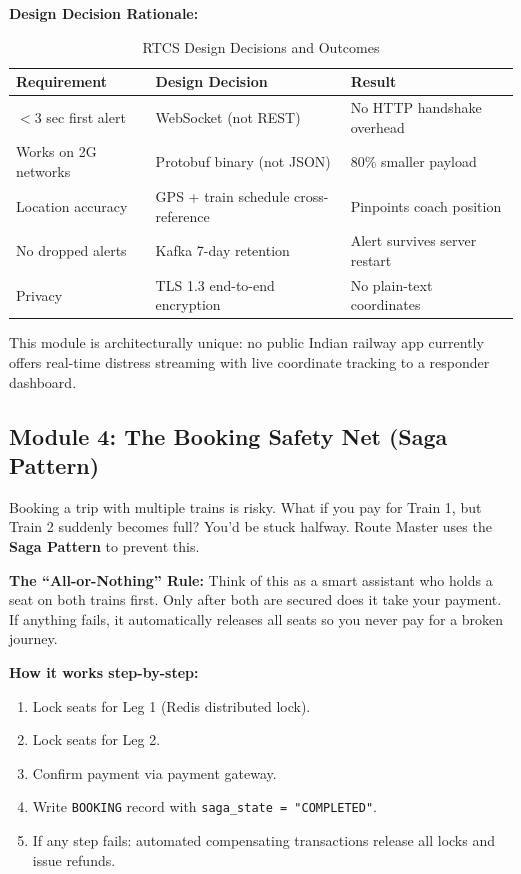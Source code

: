 \documentclass[12pt,a4paper]{report}
\begin{document}
\textbf{Design Decision Rationale:}

\begin{table}[h!]
\centering
\caption{RTCS Design Decisions and Outcomes}
\begin{tabularx}{\textwidth}{lXX}
\toprule
\textbf{Requirement} & \textbf{Design Decision} & \textbf{Result} \\
\midrule
$<$3 sec first alert & WebSocket (not REST) & No HTTP handshake overhead \\
Works on 2G networks & Protobuf binary (not JSON) & 80\% smaller payload \\
Location accuracy & GPS + train schedule cross-reference & Pinpoints coach position \\
No dropped alerts & Kafka 7-day retention & Alert survives server restart \\
Privacy & TLS 1.3 end-to-end encryption & No plain-text coordinates \\
\bottomrule
\end{tabularx}
\end{table}

\begin{tcolorbox}[alertbox]
This module is architecturally unique: no public Indian railway app currently offers real-time distress streaming with live coordinate tracking to a responder dashboard.
\end{tcolorbox}

\subsection{Module 4: The Booking Safety Net (Saga Pattern)}

Booking a trip with multiple trains is risky. What if you pay for Train 1, but Train 2 suddenly becomes full? You’d be stuck halfway. Route Master uses the \textbf{Saga Pattern} to prevent this.

\begin{tcolorbox}[keybox]
\textbf{The ``All-or-Nothing'' Rule:} Think of this as a smart assistant who holds a seat on both trains first. Only after both are secured does it take your payment. If anything fails, it automatically releases all seats so you never pay for a broken journey.
\end{tcolorbox}

\textbf{How it works step-by-step:}

\begin{enumerate}[leftmargin=1.5em]
  \item Lock seats for Leg 1 (Redis distributed lock).
  \item Lock seats for Leg 2.
  \item Confirm payment via payment gateway.
  \item Write \texttt{BOOKING} record with \texttt{saga\_state = "COMPLETED"}.
  \item If any step fails: automated compensating transactions release all locks and issue refunds.
\end{enumerate}
\end{document}
